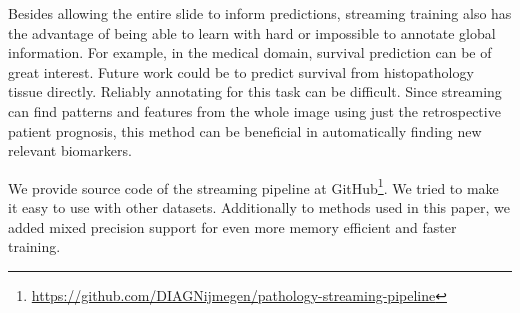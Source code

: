\documentclass[
  12pt,
  a5,margin=2cmpaper,
]{article}
\begin{document}
Besides allowing the entire slide to inform predictions, streaming
training also has the advantage of being able to learn with hard or
impossible to annotate global information. For example, in the medical
domain, survival prediction can be of great interest. Future work could
be to predict survival from histopathology tissue directly. Reliably
annotating for this task can be difficult. Since streaming can find
patterns and features from the whole image using just the retrospective
patient prognosis, this method can be beneficial in automatically
finding new relevant biomarkers.

We provide source code of the streaming pipeline at GitHub\footnote{\url{https://github.com/DIAGNijmegen/pathology-streaming-pipeline}}.
We tried to make it easy to use with other datasets. Additionally to
methods used in this paper, we added mixed precision support for even
more memory efficient and faster training.
\end{document}
